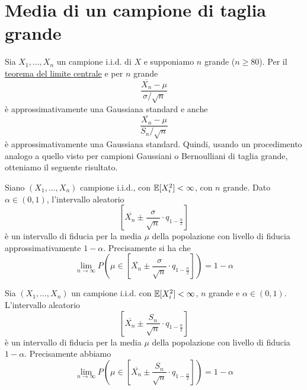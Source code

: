 \section{Media di un campione di taglia grande}
Sia $X_1, \dots, X_n$ un campione i.i.d. di $X$ e supponiamo $n$ grande ($n \geq 80$). Per il
\hyperref[th: tlc]{teorema del limite centrale} e per $n$ grande
\[ \frac{\overline{X_n} - \mu}{\sigma / \sqrt{n}} \]
è approssimativamente una Gaussiana standard e anche
\[ \frac{\overline{X_n} - \mu}{S_n / \sqrt{n}} \]
è approssimativamente una Gaussiana standard. Quindi, usando un procedimento analogo a quello visto
per campioni Gaussiani o Bernoulliani di taglia grande, otteniamo il seguente risultato.

\begin{proposition}
	Siano $(X_1, \dots, X_n)$ campione i.i.d., con $\mathbb{E}[X_i^2] < \infty$, con $n$ grande. Dato
	$\alpha \in (0,1)$, l'intervallo aleatorio
	\[ \left[ \overline{X_n} \pm \frac{\sigma}{\sqrt{n}} \cdot q_{1 - \frac{\alpha}{2}} \right] \]
	è un intervallo di fiducia per la media $\mu$ della popolazione con livello di fiducia
	approssimativamente $1 - \alpha$. Precisamente si ha che
	\[
		\lim_{n \to \infty} P \left( \mu \in \left[
			\overline{X_n} \pm \frac{\sigma}{\sqrt{n}} \cdot q_{1 - \frac{\alpha}{2}}
			\right] \right) = 1 - \alpha
	\]
\end{proposition}

\begin{proposition}
	Sia $(X_1, \dots, X_n)$ un campione i.i.d. con $\mathbb{E}[X_i^2] < \infty$, $n$ grande e
	$\alpha \in (0,1)$. L'intervallo aleatorio
	\[ \left[ \overline{X_n} \pm \frac{S_n}{\sqrt{n}} \cdot q_{1 - \frac{\alpha}{2}} \right] \]
	è un intervallo di fiducia per la media $\mu$ della popolazione con livello di fiducia
	$1-\alpha$. Precisamente abbiamo
	\[
		\lim_{n \to \infty} P \left( \mu \in \left[
			\overline{X_n} \pm \frac{S_n}{\sqrt{n}} \cdot q_{1 - \frac{\alpha}{2}}
			\right] \right) = 1 - \alpha
	\]
\end{proposition}

